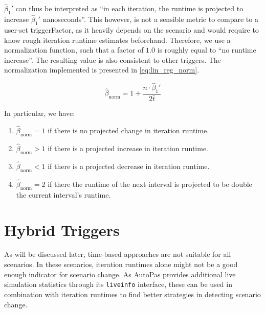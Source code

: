 $\hat\beta_1'$ can thus be interpreted as \enquote{in each iteration, the runtime is projected to increase $\hat\beta_1'$ nanoseconds}. This however, is not a sensible metric to compare to a user-set triggerFactor, as it heavily depends on the scenario and would require to know rough iteration runtime estimates beforehand. Therefore, we use a normalization function, such that a factor of $1.0$ is roughly equal to \enquote{no runtime increase}. The resulting value is also consistent to other triggers. The normalization implemented is presented in \eqref{eq:lin_reg_norm}.


\begin{equation}
	\hat\beta_{\text{norm}} = 1+\frac{n\cdot\hat\beta_1'}{2\bar t}\label{eq:lin_reg_norm}
\end{equation}

In particular, we have:

\begin{enumerate}[label=(\roman*)]
	\item $\hat\beta_{\text{norm}} = 1$ if there is no projected change in iteration runtime.
	\item $\hat\beta_{\text{norm}} > 1$ if there is a projected increase in iteration runtime.
	\item $\hat\beta_{\text{norm}} < 1$ if there is a projected decrease in iteration runtime.
	\item $\hat\beta_{\text{norm}} = 2$ if there the runtime of the next interval is projected to be double the current interval's runtime.
\end{enumerate}

\section{Hybrid Triggers}
As will be discussed later, time-based approaches are not suitable for all scenarios. In these scenarios, iteration runtimes alone might not be a good enough indicator for scenario change. As AutoPas provides additional live simulation statistics through its \texttt{liveinfo} interface, these can be used in combination with iteration runtimes to find better strategies in detecting scenario change.


